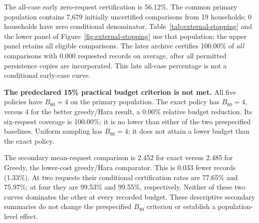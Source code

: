 \documentclass[12pt]{article}
\begin{document}
The all-case early zero-request certification is 56.12\%. The common primary population contains 7,679 initially uncertified comparisons from 19 households; 0 households have zero conditional denominator. Table~\ref{tab:external-stopping} and the lower panel of Figure~\ref{fig:external-stopping} use that population; the upper panel retains all eligible comparisons. The later archive certifies 100.00\% of \emph{all} comparisons with 0.000 requested records on average, after all permitted persistence copies are incorporated. This late all-case percentage is not a conditional early-case curve.

\textbf{The predeclared 15\% practical budget criterion is not met.} All five policies have $B_{80}=4$ on the primary population. The exact policy has $B_{80}=4$, versus 4 for the better greedy/Hara result, a 0.00\% relative budget reduction. Its six-request coverage is 100.00\%; it is no lower than either of the two prespecified baselines. Uniform sampling has $B_{80}=4$; it does not attain a lower budget than the exact policy.

The secondary mean-request comparison is 2.452 for exact versus 2.485 for Greedy, the lower-cost greedy/Hara comparator. This is 0.033 fewer records (1.33\%). At two requests their conditional certification rates are 77.65\% and 75.97\%; at four they are 99.53\% and 99.55\%, respectively. Neither of these two curves dominates the other at every recorded budget. These descriptive secondary summaries do not change the prespecified $B_{80}$ criterion or establish a population-level effect.
\end{document}
